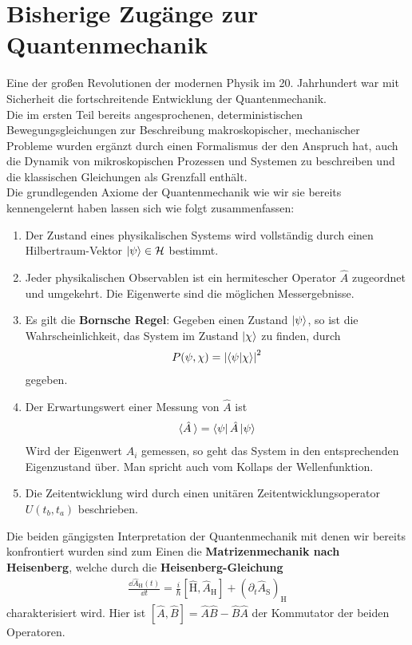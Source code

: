 \section{Bisherige Zugänge zur Quantenmechanik}
Eine der großen Revolutionen der modernen Physik im 20. Jahrhundert war mit Sicherheit die fortschreitende Entwicklung der Quantenmechanik. \\
Die im ersten Teil bereits angesprochenen, deterministischen Bewegungsgleichungen zur Beschreibung makroskopischer, mechanischer Probleme wurden ergänzt durch einen Formalismus der den Anspruch hat, auch die Dynamik von mikroskopischen Prozessen und Systemen zu beschreiben und die klassischen Gleichungen als Grenzfall enthält. \\
Die grundlegenden Axiome der Quantenmechanik wie wir sie bereits kennengelernt haben lassen sich wie folgt zusammenfassen:
\begin{enumerate}
	\item Der Zustand eines physikalischen Systems wird vollständig durch einen Hilbertraum-Vektor $\ket{\psi} \in \mathcal{H}$ bestimmt.
	\item Jeder physikalischen Observablen ist ein hermitescher Operator $\hat{A}$ zugeordnet und umgekehrt. Die Eigenwerte sind die möglichen Messergebnisse.
	\item Es gilt die \textbf{Bornsche Regel}: Gegeben einen Zustand $\ket{\psi} $, so ist die Wahrscheinlichkeit, das System im Zustand $\ket{\chi}$ zu finden, durch
	\begin{align}
		P(\psi, \chi) = \abs{\braket{\psi}{\chi}}^2
	\end{align}
	gegeben.
	\item Der Erwartungswert einer Messung von $\hat{A}$ ist 
	\begin{align}
		\langle \hat{A} \hspace{2pt} \rangle = \bra{\psi}\hat{A}\ket{\psi}
	\end{align}
 	 Wird der Eigenwert $A_i$ gemessen, so geht das System in den entsprechenden Eigenzustand über. Man spricht auch vom Kollaps der Wellenfunktion.
 	 \item  Die Zeitentwicklung wird durch einen unitären Zeitentwicklungsoperator $U(t_b, t_a)$ beschrieben.
\end{enumerate}
Die beiden gängigsten Interpretation der Quantenmechanik mit denen wir bereits konfrontiert wurden sind zum Einen die \textbf{Matrizenmechanik nach Heisenberg}, welche durch die \textbf{Heisenberg-Gleichung}
\begin{align}
	\frac{\dd\hat{A}_{\text{H}}(t)}{\dd t} = \frac{i}{\hbar}\left[\hat{\text{H}},\hat{A}_{\text{H}}\right] + \left(\partial_t \hat{A}_{\text{S}}\right)_{\text{H}}
\end{align}
 charakterisiert wird. Hier ist $\left[\hat{A},\hat{B}\right] = \hat{A}\hat{B} - \hat{B}\hat{A}$ der Kommutator der beiden Operatoren. \\
 

